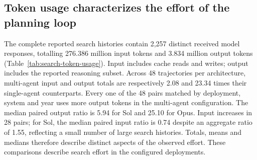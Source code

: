 \documentclass[pdflatex,sn-nature]{sn-jnl}
\begin{document}
\begin{appendices}
\subsection{Token usage characterizes the effort of the planning loop}\label{sec:token-results}

The complete reported search histories contain 2,257 distinct received model responses, totalling 276.386 million input tokens and 3.834 million output tokens (Table~\ref{tab:search-token-usage}). Input includes cache reads and writes; output includes the reported reasoning subset. Across 48 trajectories per architecture, multi-agent input and output totals are respectively 2.08 and 23.34 times their single-agent counterparts. Every one of the 48 pairs matched by deployment, system and year uses more output tokens in the multi-agent configuration. The median paired output ratio is 5.94 for Sol and 25.10 for Opus. Input increases in 28 pairs; for Sol, the median paired input ratio is 0.74 despite an aggregate ratio of 1.55, reflecting a small number of large search histories. Totals, means and medians therefore describe distinct aspects of the observed effort. These comparisons describe search effort in the configured deployments.

\begin{tableorg}[tbp]
\caption{\textbf{Input and output tokens across all 96 loose-cap reference trajectories.} Input columns use millions of tokens; output columns use thousands. Means and medians are per trajectory. Counts cover complete search histories, including repeated context and inherited responses counted once. Input includes cache reads and writes; output includes reasoning. The archived evidence retains integer token counts for every response.}
\label{tab:search-token-usage}
\centering\small
{}
\end{tableorg}


\end{appendices}
\end{document}
